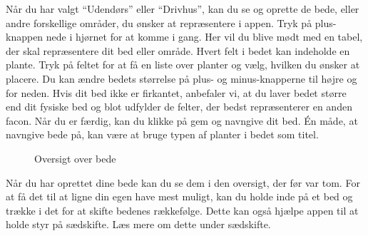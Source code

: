\begin{minipage}{0.55\textwidth}    
Når du har valgt ``Udendørs'' eller ``Drivhus'', kan du se og oprette de bede, eller andre forskellige områder, du ønsker at repræsentere i appen. Tryk på plus-knappen nede i hjørnet for at komme i gang.
Her vil du blive mødt med en tabel, der skal repræsentere dit bed eller område. Hvert felt i bedet kan indeholde en plante. Tryk på feltet for at få en liste over planter og vælg, hvilken du ønsker at placere. Du kan ændre bedets størrelse på plus- og minus-knapperne til højre og for neden. Hvis dit bed ikke er firkantet, anbefaler vi, at du laver bedet større end dit fysiske bed og blot udfylder de felter, der bedst repræsenterer en anden facon. Når du er færdig, kan du klikke på gem og navngive dit bed. Én måde, at navngive bede på, kan være at bruge typen af planter i bedet som titel.
\end{minipage} 

\begin{minipage}{0.4\textwidth}
\begin{figure}[H]
    \centering
    \caption{Oversigt over bede}
\end{figure}
\end{minipage} \hfill
\begin{minipage}{0.5\textwidth}
Når du har oprettet dine bede kan du se dem i den oversigt, der før var tom.
For at få det til at ligne din egen have mest muligt, kan du holde inde på et bed og trække i det for at skifte bedenes rækkefølge. Dette kan også hjælpe appen til at holde styr på sædskifte. Læs mere om dette under sædskifte.
\end{minipage}

